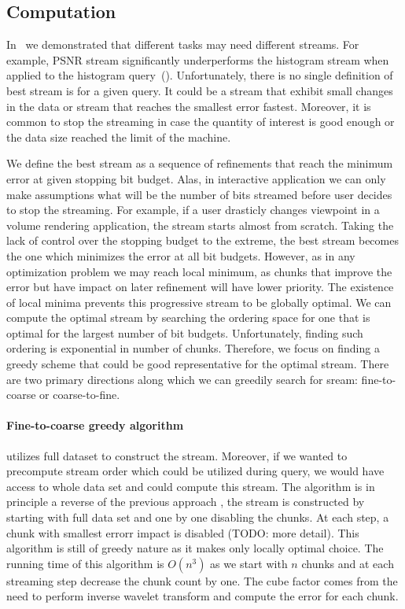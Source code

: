 \subsection{Computation}
In~ we demonstrated that different tasks may need different streams. For
example, PSNR stream significantly underperforms the histogram stream when applied to the histogram
query~(). Unfortunately, there is no single definition of best stream
is for a given query. It could be a stream that exhibit small changes in the data or stream that
reaches the smallest error fastest. Moreover, it is common to stop the streaming in case the
quantity of interest is good enough or the data size reached the limit of the machine.

We define the best stream as a sequence of refinements that reach the minimum error at given
stopping bit budget. Alas, in interactive application we can only make assumptions what will be the
number of bits streamed before user decides to stop the streaming. For example, if a user drasticly
changes viewpoint in a volume rendering application, the stream starts almost from scratch. Taking
the lack of control over the stopping budget to the extreme, the best stream becomes the one which
minimizes the error at all bit budgets. However, as in any optimization problem we may reach local
minimum, as chunks that improve the error but have impact on later refinement will have lower
priority.  The existence of local minima prevents this progressive stream to be globally optimal. We
can compute the optimal stream by searching the ordering space for one that is optimal for the
largest number of bit budgets. Unfortunately, finding such ordering is exponential in number of
chunks. Therefore, we focus on finding a greedy scheme that could be good representative for the
optimal stream. There are two primary directions along which we can greedily search for sream:
fine-to-coarse or coarse-to-fine.

\paragraph*{Fine-to-coarse greedy algorithm} utilizes full dataset to construct the stream.
Moreover, if we wanted to precompute stream order which could be utilized during query, we would
have access to whole data set and could compute this stream. The algorithm is in principle a reverse
of the previous approach , the stream is constructed by starting with full data set and one by one
disabling the chunks. At each step, a chunk with smallest errorr impact is disabled (TODO: more
detail). This algorithm is still of greedy nature as it makes only locally optimal choice. The
running time of this algorithm is $O(n^3)$ as we start with $n$ chunks and at each streaming step
decrease the chunk count by one. The cube factor comes from the need to perform inverse wavelet
transform and compute the error for each chunk.

